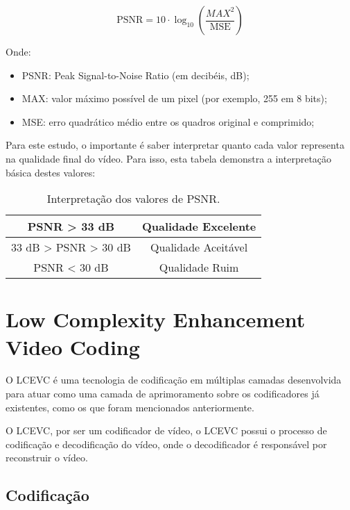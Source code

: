 \[
\text{PSNR} = 10 \cdot \log_{10} \left( \frac{MAX^2}{\text{MSE}} \right)
\]

Onde:
\begin{itemize}
    \item  PSNR: Peak Signal-to-Noise Ratio (em decibéis, dB);
    \item MAX: valor máximo possível de um pixel (por exemplo, 255 em 8 bits);
    \item MSE: erro quadrático médio entre os quadros original e comprimido;
\end{itemize}

Para este estudo, o importante é saber interpretar quanto cada valor representa
na qualidade final do vídeo. Para isso, esta tabela demonstra a interpretação
básica destes valores:

\begin{table}[h]
    \centering
    \begin{tabular}{|c|c|}
        \hline
        PSNR > 33 dB  & Qualidade Excelente\\
        \hline
        33 dB > PSNR > 30 dB  & Qualidade Aceitável\\
        \hline
        PSNR < 30 dB  & Qualidade Ruim\\
        \hline
    \end{tabular}
    \caption{Interpretação dos valores de PSNR. \cite{Syahbana2011APSNR}}
    \label{tab:psnr}
\end{table}

\section{Low Complexity Enhancement Video Coding}

O \acrshort{LCEVC} é uma tecnologia de codificação em múltiplas camadas desenvolvida para atuar
como uma camada de aprimoramento sobre os codificadores já existentes, como os que foram
mencionados anteriormente.

O \acrshort{LCEVC}, por ser um codificador de vídeo, o \acrshort{LCEVC} possui o processo de
codificação e decodificação do vídeo, onde o decodificador é responsável por reconstruir o vídeo.

\subsection{Codificação}

%

